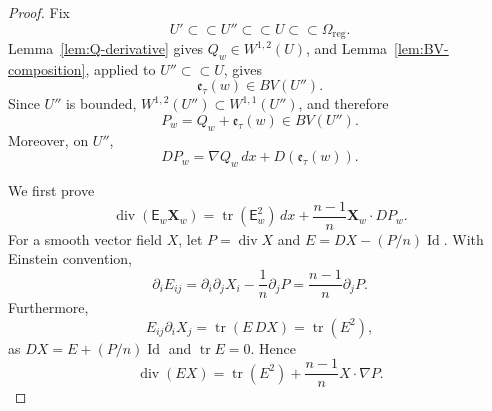 \documentclass[reqno,12pt]{amsart}
\numberwithin{equation}{section}
\theoremstyle{remark}
\newcommand{\dd}{\,d}
\newcommand{\tr}{\operatorname{tr}}
\newcommand{\Id}{\operatorname{Id}}
\newcommand{\Xbf}{\mathbf X}
\begin{document}
\begin{proof}
Fix
$$
U'\subset\subset U''\subset\subset U \subset\subset\Omega_{\mathrm{reg}}.
$$
Lemma~\ref{lem:Q-derivative} gives
$Q_w\in W^{1,2}(U)$, and
Lemma~\ref{lem:BV-composition}, applied to
$U''\subset \subset U$, gives
$$
    \mathfrak e_\tau(w)\in BV(U'').
$$
Since $U''$ is bounded, $W^{1,2}(U'')\subset W^{1,1}(U'')$, and therefore
$$
    P_w=Q_w+\mathfrak e_\tau(w)\in BV(U'').
$$
Moreover, on $U''$, 
\begin{equation}\label{eq:DP-decomposition}
DP_w = \nabla Q_w\,dx+D(\mathfrak e_\tau(w)).
\end{equation}

We first prove
\begin{equation}\label{eq:div-EX}
 \operatorname{div}(\mathsf E_w\Xbf_w)
 =\tr(\mathsf E_w^2)\dd x  +\frac{n-1}{n}\Xbf_w\cdot DP_w.
\end{equation}
For a smooth vector field $X$, let
$P=\operatorname{div}X$ and $E=DX-(P/n)\Id$.  With Einstein convention,
$$
\partial_iE_{ij} =\partial_i\partial_jX_i-\frac1n\partial_jP
=\frac{n-1}{n}\partial_j P.
$$
Furthermore,
$$
 E_{ij}\partial_iX_j =\tr(E\,DX) =\tr(E^2),
$$
as $DX=E+(P/n)\Id$ and $\tr E=0$.  Hence
$$\operatorname{div}(EX)=\tr(E^2)+\frac{n-1}n X\cdot\nabla P. $$


\end{proof}
\end{document}
